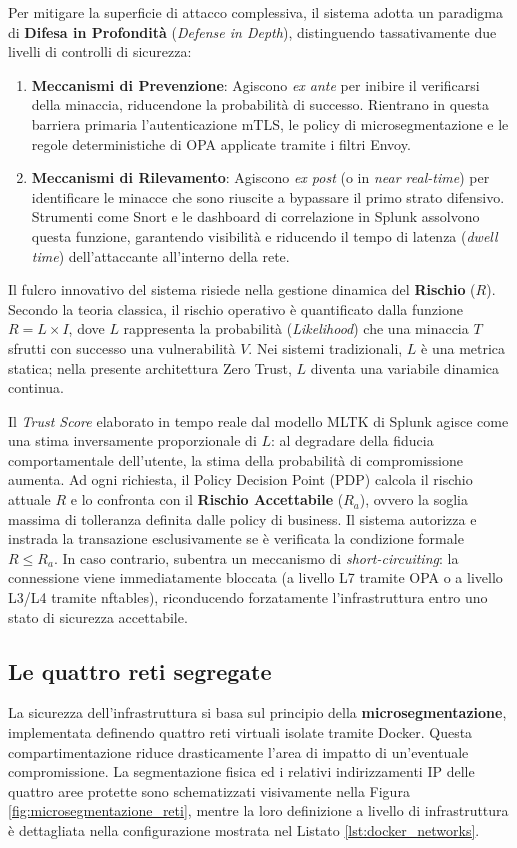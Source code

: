 Per mitigare la superficie di attacco complessiva, il sistema adotta un paradigma di \textbf{Difesa in Profondità} (\textit{Defense in Depth}), distinguendo tassativamente due livelli di controlli di sicurezza:

\begin{enumerate}
    \item \textbf{Meccanismi di Prevenzione}: Agiscono \textit{ex ante} per inibire il verificarsi della minaccia, riducendone la probabilità di successo. Rientrano in questa barriera primaria l'autenticazione mTLS, le policy di microsegmentazione e le regole deterministiche di OPA applicate tramite i filtri Envoy.
    \item \textbf{Meccanismi di Rilevamento}: Agiscono \textit{ex post} (o in \textit{near real-time}) per identificare le minacce che sono riuscite a bypassare il primo strato difensivo. Strumenti come Snort e le dashboard di correlazione in Splunk assolvono questa funzione, garantendo visibilità e riducendo il tempo di latenza (\textit{dwell time}) dell'attaccante all'interno della rete.
\end{enumerate}

Il fulcro innovativo del sistema risiede nella gestione dinamica del \textbf{Rischio} ($R$). Secondo la teoria classica, il rischio operativo è quantificato dalla funzione $R = L \times I$, dove $L$ rappresenta la probabilità (\textit{Likelihood}) che una minaccia $T$ sfrutti con successo una vulnerabilità $V$. Nei sistemi tradizionali, $L$ è una metrica statica; nella presente architettura Zero Trust, $L$ diventa una variabile dinamica continua. 

Il \textit{Trust Score} elaborato in tempo reale dal modello MLTK di Splunk agisce come una stima inversamente proporzionale di $L$: al degradare della fiducia comportamentale dell'utente, la stima della probabilità di compromissione aumenta. Ad ogni richiesta, il Policy Decision Point (PDP) calcola il rischio attuale $R$ e lo confronta con il \textbf{Rischio Accettabile} ($R_a$), ovvero la soglia massima di tolleranza definita dalle policy di business. Il sistema autorizza e instrada la transazione esclusivamente se è verificata la condizione formale $R \leq R_a$. In caso contrario, subentra un meccanismo di \textit{short-circuiting}: la connessione viene immediatamente bloccata (a livello L7 tramite OPA o a livello L3/L4 tramite nftables), riconducendo forzatamente l'infrastruttura entro uno stato di sicurezza accettabile.
\subsection{Le quattro reti segregate}
La sicurezza dell'infrastruttura si basa sul principio della \textbf{microsegmentazione}, implementata definendo quattro reti virtuali isolate tramite Docker. Questa compartimentazione riduce drasticamente l'area di impatto di un'eventuale compromissione. La segmentazione fisica ed i relativi indirizzamenti IP delle quattro aree protette sono schematizzati visivamente nella Figura \ref{fig:microsegmentazione_reti}, mentre la loro definizione a livello di infrastruttura è dettagliata nella configurazione mostrata nel Listato \ref{lst:docker_networks}.

